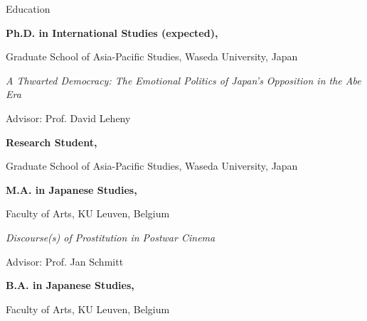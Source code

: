 \begin{rubric}{Education}

  \entry*[2020/09 -- 2026/03]%
  \textbf{Ph.D. in International Studies (expected),}
  \par Graduate School of Asia-Pacific Studies, Waseda University, Japan%
  \par \emph{A Thwarted Democracy: The Emotional Politics of Japan's Opposition in the Abe Era}%
  \par Advisor: Prof. David Leheny

  \entry*[2019/04 -- 2020/09]%
  \textbf{Research Student,}
  \par Graduate School of Asia-Pacific Studies, Waseda University, Japan

  \entry*[2014/09 -- 2016/09]%
  \textbf{M.A. in Japanese Studies,}
  \par Faculty of Arts, KU Leuven, Belgium%
  \par \emph{Discourse(s) of Prostitution in Postwar Cinema}%
  \par Advisor: Prof. Jan Schmitt

  \entry*[2010/09 -- 2014/09]%
  \textbf{B.A. in Japanese Studies,}
  \par Faculty of Arts, KU Leuven, Belgium
\end{rubric}
